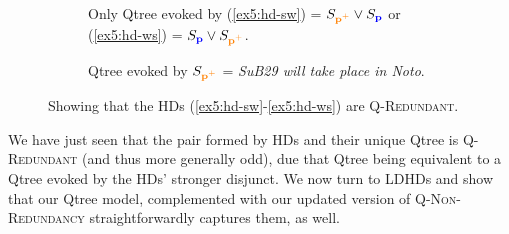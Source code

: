 \begin{figure}[H]
	\centering
	\begin{subfigure}[b]{.45\linewidth}
		\centering
		\caption[]{Only Qtree evoked by (\ref{ex5:hd-sw}) = $S_{\textbf{\textcolor{orange}{p$^+$}}} \vee S_{\textbf{\textcolor{blue}{p}}}$ or (\ref{ex5:hd-ws}) = $S_{\textbf{\textcolor{blue}{p}}} \vee S_{\textbf{\textcolor{orange}{p$^+$}}}$.}
		\label{fig5:qtree-noto-or-italy-r}
	\end{subfigure}
	\hfill
	\begin{subfigure}[b]{.45\linewidth}
		\centering
		\caption[]{Qtree evoked by $S_{\textbf{\textcolor{orange}{p$^+$}}}$ = \textit{SuB29 will take place in Noto}.}\label{fig5:qtree-noto-tiered-r}
	\end{subfigure}
	\caption[]{Showing that the HDs (\ref{ex5:hd-sw}-\ref{ex5:hd-ws}) are \textsc{Q-Redundant}.}
\end{figure} 
\begin{exe}
	\label{ex5:minimal-path-equality-hd}
\end{exe}

We have just seen that the pair formed by HDs and their unique Qtree is \textsc{Q-Redundant} (and thus more generally odd), due that Qtree being equivalent to a Qtree evoked by the HDs' stronger disjunct. We now turn to LDHDs and show that our Qtree model, complemented with our updated version of \textsc{Q-Non-Redundancy} straightforwardly captures them, as well.


